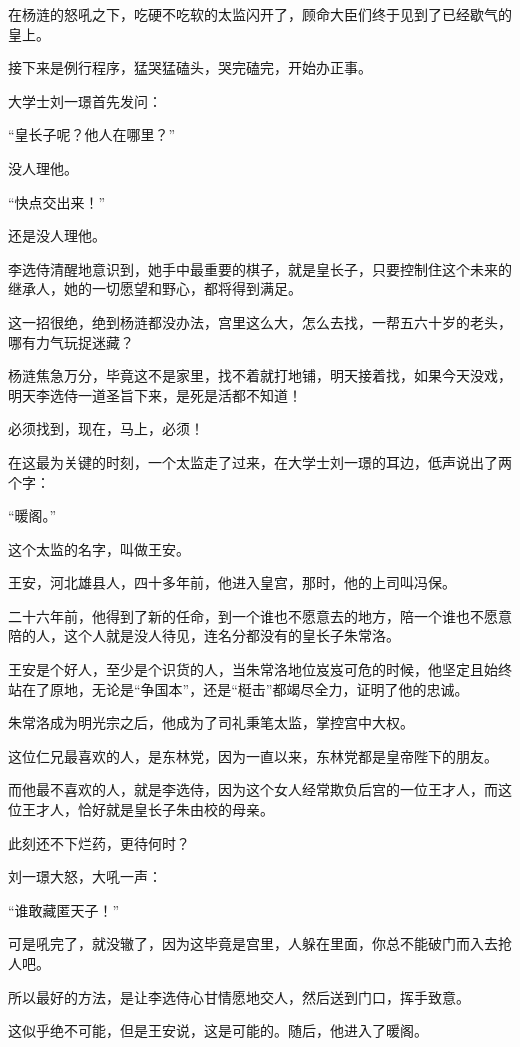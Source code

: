 \begin{multicols}{\theparacolNo}
		在杨涟的怒吼之下，吃硬不吃软的太监闪开了，顾命大臣们终于见到了已经歇气的皇上。

		接下来是例行程序，猛哭猛磕头，哭完磕完，开始办正事。

		大学士刘一璟首先发问：

		“皇长子呢？他人在哪里？”

		没人理他。

		“快点交出来！”

		还是没人理他。

		李选侍清醒地意识到，她手中最重要的棋子，就是皇长子，只要控制住这个未来的继承人，她的一切愿望和野心，都将得到满足。

		这一招很绝，绝到杨涟都没办法，宫里这么大，怎么去找，一帮五六十岁的老头，哪有力气玩捉迷藏？

		杨涟焦急万分，毕竟这不是家里，找不着就打地铺，明天接着找，如果今天没戏，明天李选侍一道圣旨下来，是死是活都不知道！

		必须找到，现在，马上，必须！

		在这最为关键的时刻，一个太监走了过来，在大学士刘一璟的耳边，低声说出了两个字：

		“暖阁。”

		这个太监的名字，叫做王安。

		王安，河北雄县人，四十多年前，他进入皇宫，那时，他的上司叫冯保。

		二十六年前，他得到了新的任命，到一个谁也不愿意去的地方，陪一个谁也不愿意陪的人，这个人就是没人待见，连名分都没有的皇长子朱常洛。

		王安是个好人，至少是个识货的人，当朱常洛地位岌岌可危的时候，他坚定且始终站在了原地，无论是“争国本”，还是“梃击”都竭尽全力，证明了他的忠诚。

		朱常洛成为明光宗之后，他成为了司礼秉笔太监，掌控宫中大权。

		这位仁兄最喜欢的人，是东林党，因为一直以来，东林党都是皇帝陛下的朋友。

		而他最不喜欢的人，就是李选侍，因为这个女人经常欺负后宫的一位王才人，而这位王才人，恰好就是皇长子朱由校的母亲。

		此刻还不下烂药，更待何时？

		刘一璟大怒，大吼一声：

		“谁敢藏匿天子！”

		可是吼完了，就没辙了，因为这毕竟是宫里，人躲在里面，你总不能破门而入去抢人吧。

		所以最好的方法，是让李选侍心甘情愿地交人，然后送到门口，挥手致意。

		这似乎绝不可能，但是王安说，这是可能的。随后，他进入了暖阁。


\end{multicols}
